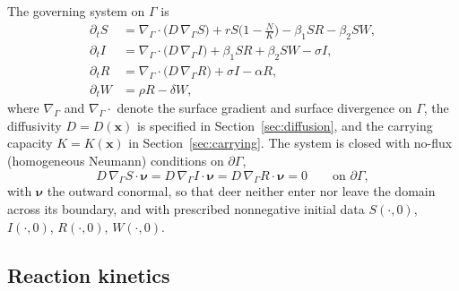\documentclass[11pt]{article}
\newcommand{\Grad}{\nabla_\Gamma}
\newcommand{\Div}{\nabla_\Gamma\cdot}
\begin{document}
The governing system on $\Gamma$ is
\begin{align}
  \partial_t S &= \Div\big(D\,\Grad S\big) + rS\Big(1-\frac{N}{K}\Big) - \beta_1 S R - \beta_2 S W, \label{eq:S} \\
  \partial_t I &= \Div\big(D\,\Grad I\big) + \beta_1 S R + \beta_2 S W - \sigma I, \label{eq:I} \\
  \partial_t R &= \Div\big(D\,\Grad R\big) + \sigma I - \alpha R, \label{eq:R} \\
  \partial_t W &= \rho R - \delta W, \label{eq:W}
\end{align}
where $\Grad$ and $\Div$ denote the surface gradient and surface divergence on $\Gamma$, the diffusivity $D = D(\mathbf{x})$ is specified in Section~\ref{sec:diffusion}, and the carrying capacity $K = K(\mathbf{x})$ in Section~\ref{sec:carrying}. The system is closed with no-flux (homogeneous Neumann) conditions on $\partial\Gamma$,
\begin{equation}
  D\,\Grad S\cdot\boldsymbol{\nu} = D\,\Grad I\cdot\boldsymbol{\nu} = D\,\Grad R\cdot\boldsymbol{\nu} = 0
  \qquad \text{on } \partial\Gamma,
  \label{eq:bc}
\end{equation}
with $\boldsymbol{\nu}$ the outward conormal, so that deer neither enter nor leave the domain across its boundary, and with prescribed nonnegative initial data $S(\cdot,0)$, $I(\cdot,0)$, $R(\cdot,0)$, $W(\cdot,0)$.

\subsection{Reaction kinetics}
\end{document}

